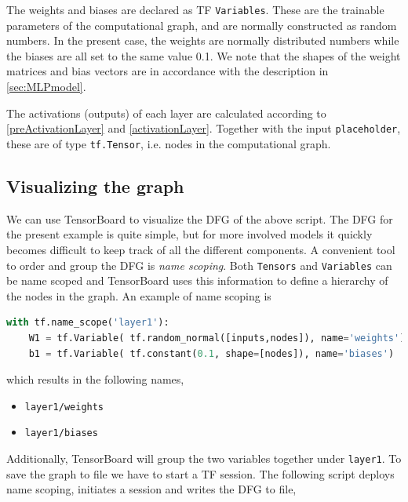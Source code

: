 \documentclass[twoside,english]{uiofysmaster}
\begin{document}
The weights and biases are declared as TF \texttt{Variables}. These are the trainable parameters 
of the computational graph, and are normally constructed as random numbers. In the present case,
the weights are normally distributed numbers while the biases are all set to the same value 0.1. 
We note that the shapes of the weight matrices and bias vectors are in accordance with the description in 
\autoref{sec:MLPmodel}.

The activations (outputs) of each layer are calculated according to \eqref{preActivationLayer} and \eqref{activationLayer}. 
Together with the input \texttt{placeholder}, these are of type \texttt{tf.Tensor}, i.e. nodes in the computational 
graph. 

\subsection{Visualizing the graph}
We can use TensorBoard to visualize the DFG of the above script. The DFG for the present example is quite
simple, but for more involved models it quickly becomes difficult to keep track of all the different components. 
A convenient tool to order and group the DFG is \textit{name scoping}. Both \texttt{Tensors} and \texttt{Variables} can 
be name scoped and TensorBoard uses this information to define a hierarchy of the nodes in the graph. 
An example of name scoping is
\begin{lstlisting}[language=python]
 with tf.name_scope('layer1'):
    W1 = tf.Variable( tf.random_normal([inputs,nodes]), name='weights')
    b1 = tf.Variable( tf.constant(0.1, shape=[nodes]), name='biases')
\end{lstlisting}
which results in the following names,
\begin{itemize}
 \item \texttt{layer1/weights}
 \item \texttt{layer1/biases}
\end{itemize}
Additionally, TensorBoard will group the two variables together under \texttt{layer1}. 
To save the graph to file we have to start a TF session. The following script 
deploys name scoping, initiates a session and writes the DFG to file,
\end{document}
